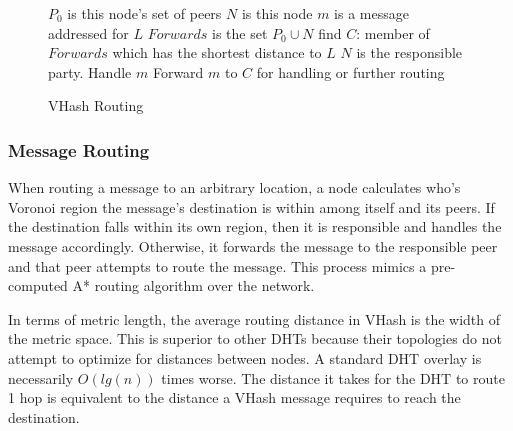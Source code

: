 \documentclass{article}
\begin{document}
\begin{figure}
\begin{minipage}{0.5\textwidth}
\vspace{-45pt}
\begin{algorithm}[H]

\caption{VHash Routing}
\label{routing}
{\footnotesize
\begin{algorithmic}[1]  %
	\STATE $P_0$ is this node's set of peers
    \STATE $N$ is this node
	\STATE $m$ is a message addressed for $L$
    \STATE $Forwards$ is the set $P_0\cup{}N$
    \STATE find $C$: member of $Forwards$ which has the shortest distance to $L$
    	\STATE $N$ is the responsible party.
        \STATE Handle $m$
    \ELSE
    	\STATE Forward $m$ to $C$ for handling or further routing
    \ENDIF
\end{algorithmic}
}
\end{algorithm}

\end{minipage}
\end{figure}
\subsubsection*{Message Routing}





When routing a message to an arbitrary location, a node calculates who's Voronoi region the message's destination is within among itself and its peers. If the destination falls within its own region, then it is responsible and handles the message accordingly. Otherwise, it forwards the message to the responsible peer and that peer attempts to route the message. This process mimics a pre-computed A* \citep{astar} routing algorithm over the network. 

In terms of metric length, the average routing distance in VHash is the width of the metric space. This is superior to other DHTs because their topologies do not attempt to optimize for distances between nodes. A standard DHT overlay is necessarily $O(lg(n))$ times worse. The distance it takes for the DHT to route 1 hop is equivalent to the distance a VHash message requires to reach the destination. 
\end{document}
